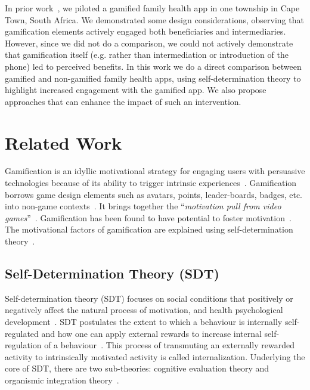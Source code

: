 \documentclass{sig-alternate}
\begin{document}
In prior work~\cite{katule2016:leveraging}, we piloted a gamified family health app in one township in Cape Town, South Africa. We demonstrated some design considerations, observing that gamification elements actively engaged both beneficiaries and intermediaries.  However, since we did not do a comparison, we could not actively demonstrate that gamification itself (e.g. rather than intermediation or introduction of the phone) led to perceived benefits. In this work we do a direct comparison between gamified and non-gamified family health apps, using self-determination theory to highlight increased engagement with the gamified app.
We also propose approaches that can enhance the impact of such an intervention. 

\section{Related Work} 
Gamification is an idyllic motivational strategy for engaging users with persuasive technologies because of its ability to trigger intrinsic experiences~\cite{hamari2014persuasive}. Gamification borrows game design elements such as avatars, points, leader-boards, badges, etc. into non-game contexts~\cite{deterding2011game}. It brings together the ``\emph{motivation pull from video games}''~\cite{ryan2006:motivationalpull}. Gamification has been found to have potential to foster motivation~\cite{sailer2013:psychological}. The motivational  factors of gamification are explained using self-determination theory~\cite{deci1985:intrinsic}.    

\subsection{Self-Determination Theory (SDT)}
Self-determination theory (SDT) focuses on social conditions that positively or negatively affect the natural process of motivation, and health psychological development~\cite{ryan2000:self}. SDT postulates the extent to which a behaviour is internally self-regulated and how one can apply external rewards to increase internal self-regulation of a behaviour~\cite{ryan2000:self}. This process of transmuting an externally rewarded activity to intrinsically motivated activity is called internalization. Underlying the core of SDT, there are two sub-theories: cognitive evaluation theory and organismic integration theory~\cite{ryan2000:self}. 
\end{document}
